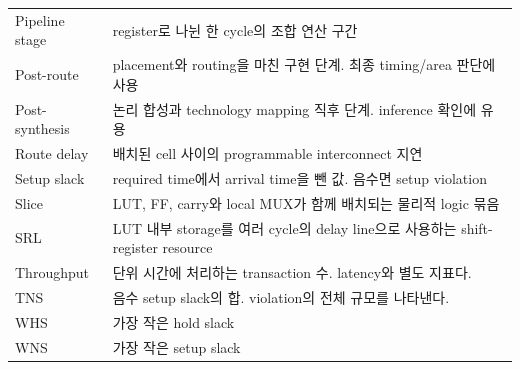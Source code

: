 \begin{longtable}{L{39mm}L{123mm}}
Pipeline stage & register로 나뉜 한 cycle의 조합 연산 구간 \\
Post-route & placement와 routing을 마친 구현 단계. 최종 timing/area 판단에 사용 \\
Post-synthesis & 논리 합성과 technology mapping 직후 단계. inference 확인에 유용 \\
Route delay & 배치된 cell 사이의 programmable interconnect 지연 \\
Setup slack & required time에서 arrival time을 뺀 값. 음수면 setup violation \\
Slice & LUT, FF, carry와 local MUX가 함께 배치되는 물리적 logic 묶음 \\
SRL & LUT 내부 storage를 여러 cycle의 delay line으로 사용하는 shift-register resource \\
Throughput & 단위 시간에 처리하는 transaction 수. latency와 별도 지표다. \\
TNS & 음수 setup slack의 합. violation의 전체 규모를 나타낸다. \\
WHS & 가장 작은 hold slack \\
WNS & 가장 작은 setup slack \\
\bottomrule
\end{longtable}
